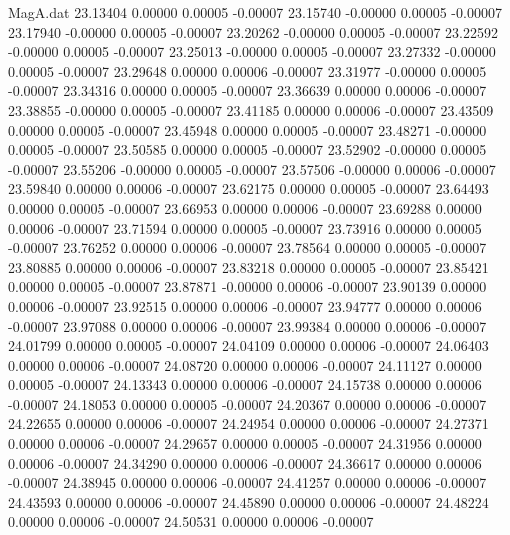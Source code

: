 \begin{filecontents}{MagA.dat}
  23.13404    0.00000    0.00005   -0.00007
  23.15740   -0.00000    0.00005   -0.00007
  23.17940   -0.00000    0.00005   -0.00007
  23.20262   -0.00000    0.00005   -0.00007
  23.22592   -0.00000    0.00005   -0.00007
  23.25013   -0.00000    0.00005   -0.00007
  23.27332   -0.00000    0.00005   -0.00007
  23.29648    0.00000    0.00006   -0.00007
  23.31977   -0.00000    0.00005   -0.00007
  23.34316    0.00000    0.00005   -0.00007
  23.36639    0.00000    0.00006   -0.00007
  23.38855   -0.00000    0.00005   -0.00007
  23.41185    0.00000    0.00006   -0.00007
  23.43509    0.00000    0.00005   -0.00007
  23.45948    0.00000    0.00005   -0.00007
  23.48271   -0.00000    0.00005   -0.00007
  23.50585    0.00000    0.00005   -0.00007
  23.52902   -0.00000    0.00005   -0.00007
  23.55206   -0.00000    0.00005   -0.00007
  23.57506   -0.00000    0.00006   -0.00007
  23.59840    0.00000    0.00006   -0.00007
  23.62175    0.00000    0.00005   -0.00007
  23.64493    0.00000    0.00005   -0.00007
  23.66953    0.00000    0.00006   -0.00007
  23.69288    0.00000    0.00006   -0.00007
  23.71594    0.00000    0.00005   -0.00007
  23.73916    0.00000    0.00005   -0.00007
  23.76252    0.00000    0.00006   -0.00007
  23.78564    0.00000    0.00005   -0.00007
  23.80885    0.00000    0.00006   -0.00007
  23.83218    0.00000    0.00005   -0.00007
  23.85421    0.00000    0.00005   -0.00007
  23.87871   -0.00000    0.00006   -0.00007
  23.90139    0.00000    0.00006   -0.00007
  23.92515    0.00000    0.00006   -0.00007
  23.94777    0.00000    0.00006   -0.00007
  23.97088    0.00000    0.00006   -0.00007
  23.99384    0.00000    0.00006   -0.00007
  24.01799    0.00000    0.00005   -0.00007
  24.04109    0.00000    0.00006   -0.00007
  24.06403    0.00000    0.00006   -0.00007
  24.08720    0.00000    0.00006   -0.00007
  24.11127    0.00000    0.00005   -0.00007
  24.13343    0.00000    0.00006   -0.00007
  24.15738    0.00000    0.00006   -0.00007
  24.18053    0.00000    0.00005   -0.00007
  24.20367    0.00000    0.00006   -0.00007
  24.22655    0.00000    0.00006   -0.00007
  24.24954    0.00000    0.00006   -0.00007
  24.27371    0.00000    0.00006   -0.00007
  24.29657    0.00000    0.00005   -0.00007
  24.31956    0.00000    0.00006   -0.00007
  24.34290    0.00000    0.00006   -0.00007
  24.36617    0.00000    0.00006   -0.00007
  24.38945    0.00000    0.00006   -0.00007
  24.41257    0.00000    0.00006   -0.00007
  24.43593    0.00000    0.00006   -0.00007
  24.45890    0.00000    0.00006   -0.00007
  24.48224    0.00000    0.00006   -0.00007
  24.50531    0.00000    0.00006   -0.00007

\end{filecontents}
